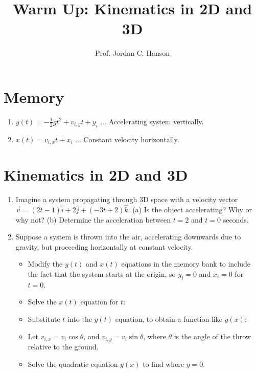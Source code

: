 \documentclass{article}
\begin{document}
\title{Warm Up: Kinematics in 2D and 3D}
\author{Prof. Jordan C. Hanson}

\maketitle

\section{Memory}

\begin{enumerate}
\item $y(t) = -\frac{1}{2}g t^2 + v_{i,y} t + y_i$ ... Accelerating system vertically.
\item $x(t) = v_{i,x} t + x_i$ ... Constant velocity horizontally.
\end{enumerate}

\section{Kinematics in 2D and 3D}

\begin{enumerate}
\item Imagine a system propagating through 3D space with a velocity vector $\vec{v} = (2t-1)\hat{i} + 2\hat{j} + (-3t+2)\hat{k}$.  (a) Is the object accelerating?  Why or why not? (b) Determine the acceleration between $t = 2$ and $t = 0$ seconds. \\ \vspace{2cm}
\item Suppose a system is thrown into the air, accelerating downwards due to gravity, but proceeding horizontally at constant velocity.
\begin{itemize}
\item Modify the $y(t)$ and $x(t)$ equations in the memory bank to include the fact that the system starts at the origin, so $y_i = 0$ and $x_i = 0$ for $t = 0$. \\ \vspace{1cm}
\item Solve the $x(t)$ equation for $t$: \\ \vspace{1cm}
\item Substitute $t$ into the $y(t)$ equation, to obtain a function like $y(x)$: \\ \vspace{1.5cm}
\item Let $v_{i,x} = v_i \cos\theta$, and $v_{i,y} = v_i \sin\theta$, where $\theta$ is the angle of the throw relative to the ground. \\ \vspace{1cm}
\item Solve the quadratic equation $y(x)$ to find where $y = 0$.
\end{itemize}
\end{enumerate}
\end{document}
